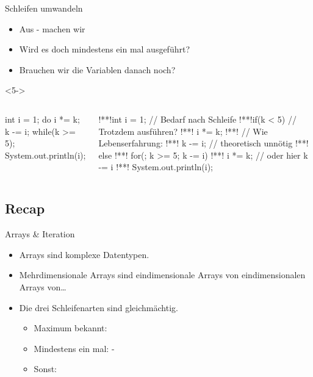 {\begin{frame}[fragile,c]{Schleifen umwandeln}
\begin{itemize}[<+(1)->]
   \itemsep3pt
   \item Aus - machen wir 
   \item Wird es doch mindestens ein mal ausgeführt?
   \item Brauchen wir die Variablen danach noch?
\end{itemize}
\begin{uncoverenv}<5->
\begin{columns}[onlytextwidth,c]
\begin{plainjava}
int i = 1;
do {
  i *= k;
  k -= i;
} while(k >= 5);
System.out.println(i);
\end{plainjava}
\vspace*{-1.15\baselineskip}\par\null\qquad{\color{lightgray}\faCaretRight}
\begin{plainjava}
!**!int i = 1; // Bedarf nach Schleife
!**!if(k < 5) { // Trotzdem ausführen?
!**!   i *= k;
!**!   // Wie Lebenserfahrung:
!**!   k -= i; // theoretisch unnötig
!**!} else {
!**!   for(; k >= 5; k -= i)
!**!      i *= k; // oder hier k -= i
!**!}
System.out.println(i);
\end{plainjava}
\end{columns}
\end{uncoverenv}
\end{frame}
\SidebarReset

\subsection{Recap}
\def\mto{\ensuremath{\to}}
\begin{frame}[c]{\hfill Arrays \& Iteration}
\begin{itemize}[<+(1)->]
   \itemsep18pt
   \item Arrays sind komplexe Datentypen.
   \item Mehrdimensionale Arrays sind eindimensionale Arrays von eindimensionalen Arrays von\ldots
   \item Die drei Schleifenarten sind gleichmächtig. \begin{itemize}
      \item Maximum bekannt: 
      \item Mindestens ein mal: -
      \item Sonst: 
   \end{itemize}
\end{itemize}
\LargeSide
\end{frame}

}
